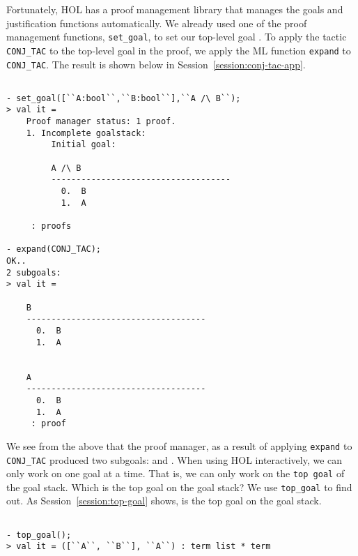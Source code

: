 Fortunately, HOL has a proof management library that manages the goals
and justification functions automatically.  We already used one of the
proof management functions, \verb|set_goal|, to set our top-level goal
. To apply the tactic \verb|CONJ_TAC| to the
top-level goal in the proof, we apply the ML function \texttt{expand}
to \verb|CONJ_TAC|. The result is shown below in
Session~\ref{session:conj-tac-app}.
\begin{session}
\label{session:conj-tac-app}
  \begin{scriptsize}
\begin{verbatim}

- set_goal([``A:bool``,``B:bool``],``A /\ B``);
> val it =
    Proof manager status: 1 proof.
    1. Incomplete goalstack:
         Initial goal:
         
         A /\ B
         ------------------------------------
           0.  B
           1.  A
         
     : proofs

- expand(CONJ_TAC);
OK..
2 subgoals:
> val it =
    
    B
    ------------------------------------
      0.  B
      1.  A
    
    
    A
    ------------------------------------
      0.  B
      1.  A
     : proof
\end{verbatim}
  \end{scriptsize}
\end{session}
We see from the above that the proof manager, as a result of applying
\texttt{expand} to \verb|CONJ_TAC| produced two subgoals:
 and .  When using HOL interactively, we can
only work on one goal at a time. That is, we can only work on the
\texttt{top goal} of the goal stack. Which is the top goal on the goal
stack?  We use \verb|top_goal| to find out. As
Session~\ref{session:top-goal} shows,  is the top goal on
the goal stack.
\begin{session}
  \label{session:top-goal}
  \begin{scriptsize}
\begin{verbatim}

- top_goal();
> val it = ([``A``, ``B``], ``A``) : term list * term
\end{verbatim}
  \end{scriptsize}
\end{session}

